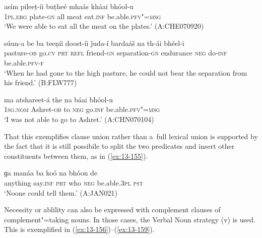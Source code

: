 \begin{exe}
\ex
\label{ex:13-152}
\gll asím pileeṭ-íi buṭheé mhaás kháai bhóol-u \\
\textsc{1pl.erg} plate-\textsc{gn} all meat eat.\textsc{inf} be.able.\textsc{pfv"=msg} \\
\glt `We were able to eat all the meat on the plates.' (A:CHE070920)

\ex
\label{ex:13-153}
\gll súun-a be ba teeṇíi doost-íi  ǰuda-í bardaáš na th-ái bhéel-i \\
pasture-\textsc{ob} go.\textsc{cv} \textsc{prt} \textsc{refl} friend-\textsc{gn} separation-\textsc{gn} endurance \textsc{neg} do-\textsc{inf} be.able.\textsc{pfv-f}  \\
\glt `When he had gone to the high pasture, he could not bear the separation from his friend.' (B:FLW777)

\ex
\label{ex:13-154}
\gll ma atshareet-á the na báai bhóol-u  \\
\textsc{1sg.nom} Ashret-\textsc{ob} to \textsc{neg} go.\textsc{inf} be.able.\textsc{pfv"=msg}  \\
\glt `I was not able to go to Ashret.' (A:CHN070104) 
\end{exe}

That this exemplifies clause union rather than a~full lexical union is supported by the fact that it is still possibile to split the two predicates and insert other constituents between them, as in (\ref{ex:13-155}).

\begin{exe}
\ex
\label{ex:13-155}
\gll ɡa manáa ba koó na bhóon de  \\
anything say.\textsc{inf} \textsc{prt} who \textsc{neg} be.able.\textsc{3pl} \textsc{pst}  \\
\glt `Noone could tell them.' (A:JAN021) 
\end{exe}

Necessity or ablility can also be expressed with complement clauses of complement"=taking nouns. In those cases, the Verbal Noun strategy (v) is used. This is exemplified in (\ref{ex:13-156})--(\ref{ex:13-159}).

